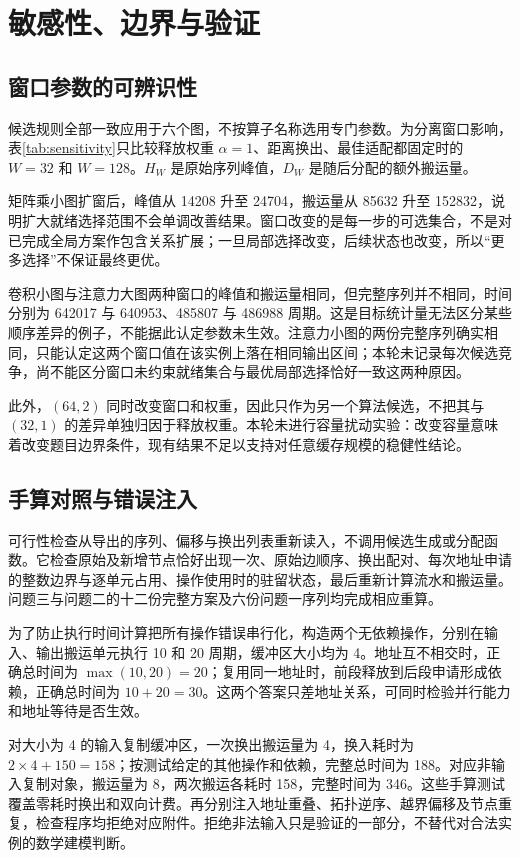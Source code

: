 \section{敏感性、边界与验证}
\subsection{窗口参数的可辨识性}
候选规则全部一致应用于六个图，不按算子名称选用专门参数。为分离窗口影响，表\ref{tab:sensitivity}只比较释放权重 $\alpha=1$、距离换出、最佳适配都固定时的 $W=32$ 和 $W=128$。$H_W$ 是原始序列峰值，$D_W$ 是随后分配的额外搬运量。
\begin{table}[H]\centering\caption{固定其他规则时的窗口对照}\label{tab:sensitivity}
\end{table}
矩阵乘小图扩窗后，峰值从 14208 升至 24704，搬运量从 85632 升至 152832，说明扩大就绪选择范围不会单调改善结果。窗口改变的是每一步的可选集合，不是对已完成全局方案作包含关系扩展；一旦局部选择改变，后续状态也改变，所以“更多选择”不保证最终更优。

卷积小图与注意力大图两种窗口的峰值和搬运量相同，但完整序列并不相同，时间分别为 642017 与 640953、485807 与 486988 周期。这是目标统计量无法区分某些顺序差异的例子，不能据此认定参数未生效。注意力小图的两份完整序列确实相同，只能认定这两个窗口值在该实例上落在相同输出区间；本轮未记录每次候选竞争，尚不能区分窗口未约束就绪集合与最优局部选择恰好一致这两种原因。

此外，$(64,2)$ 同时改变窗口和权重，因此只作为另一个算法候选，不把其与 $(32,1)$ 的差异单独归因于释放权重。本轮未进行容量扰动实验：改变容量意味着改变题目边界条件，现有结果不足以支持对任意缓存规模的稳健性结论。

\subsection{手算对照与错误注入}
可行性检查从导出的序列、偏移与换出列表重新读入，不调用候选生成或分配函数。它检查原始及新增节点恰好出现一次、原始边顺序、换出配对、每次地址申请的整数边界与逐单元占用、操作使用时的驻留状态，最后重新计算流水和搬运量。问题三与问题二的十二份完整方案及六份问题一序列均完成相应重算。

为了防止执行时间计算把所有操作错误串行化，构造两个无依赖操作，分别在输入、输出搬运单元执行 10 和 20 周期，缓冲区大小均为 4。地址互不相交时，正确总时间为 $\max(10,20)=20$；复用同一地址时，前段释放到后段申请形成依赖，正确总时间为 $10+20=30$。这两个答案只差地址关系，可同时检验并行能力和地址等待是否生效。

对大小为 4 的输入复制缓冲区，一次换出搬运量为 4，换入耗时为 $2\times4+150=158$；按测试给定的其他操作和依赖，完整总时间为 188。对应非输入复制对象，搬运量为 8，两次搬运各耗时 158，完整时间为 346。这些手算测试覆盖零耗时换出和双向计费。再分别注入地址重叠、拓扑逆序、越界偏移及节点重复，检查程序均拒绝对应附件。拒绝非法输入只是验证的一部分，不替代对合法实例的数学建模判断。

